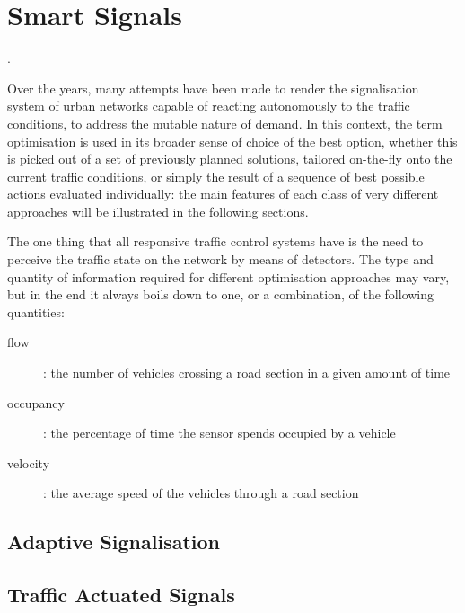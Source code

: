 \chapter{Smart Signals}
.

Over the years, many attempts have been made to render the signalisation system of urban networks capable of reacting autonomously to the traffic conditions, to address the mutable nature of demand. In this context, the term optimisation is used in its broader sense of choice of the best option, whether this is picked out of a set of previously planned solutions, tailored on-the-fly onto the current traffic conditions, or simply the result of a sequence of best possible actions evaluated individually: the main features of each class of very different approaches will be illustrated in the following sections.

The one thing that all responsive traffic control systems have is the need to perceive the traffic state on the network by means of detectors. The type and quantity of information required for different optimisation approaches may vary, but in the end it always boils down to one, or a combination, of the following quantities:
\begin{description}
\item[flow]: the number of vehicles crossing a road section in a given amount of time
\item[occupancy]: the percentage of time the sensor spends occupied by a vehicle
\item[velocity]: the average speed of the vehicles through a road section
\end{description}

\section{Adaptive Signalisation}

\section{Traffic Actuated Signals}

